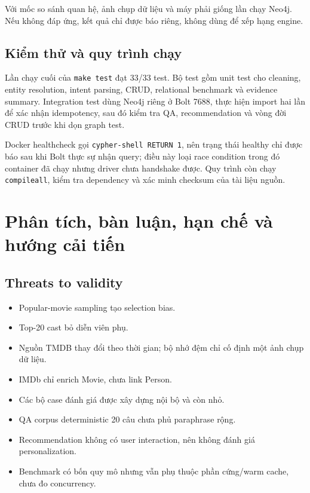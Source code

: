 Với mốc so sánh quan hệ, ảnh chụp dữ liệu và máy phải giống lần chạy Neo4j. Nếu không đáp ứng,
kết quả chỉ được báo riêng, không dùng để xếp hạng engine.

\subsection{Kiểm thử và quy trình chạy}

Lần chạy cuối của \texttt{make test} đạt 33/33 test. Bộ test gồm unit test cho cleaning,
entity resolution, intent parsing, CRUD, relational benchmark và evidence summary. Integration test
dùng Neo4j riêng ở Bolt 7688, thực hiện import hai lần để xác nhận idempotency,
sau đó kiểm tra QA, recommendation và vòng đời CRUD trước khi dọn graph test.

Docker healthcheck gọi \texttt{cypher-shell RETURN 1}, nên trạng thái healthy chỉ được
báo sau khi Bolt thực sự nhận query; điều này loại race condition trong đó
container đã chạy nhưng driver chưa handshake được. Quy trình còn chạy
\texttt{compileall}, kiểm tra dependency và xác minh checksum của tài liệu nguồn.

\section{Phân tích, bàn luận, hạn chế và hướng cải tiến}

\subsection{Threats to validity}

\begin{itemize}
\item Popular-movie sampling tạo selection bias.
\item Top-20 cast bỏ diễn viên phụ.
\item Nguồn TMDB thay đổi theo thời gian; bộ nhớ đệm chỉ cố định một ảnh chụp dữ liệu.
\item IMDb chỉ enrich Movie, chưa link Person.
\item Các bộ case đánh giá được xây dựng nội bộ và còn nhỏ.
\item QA corpus deterministic 20 câu chưa phủ paraphrase rộng.
\item Recommendation không có user interaction, nên không đánh giá personalization.
\item Benchmark có bốn quy mô nhưng vẫn phụ thuộc phần cứng/warm cache, chưa đo concurrency.
\end{itemize}

